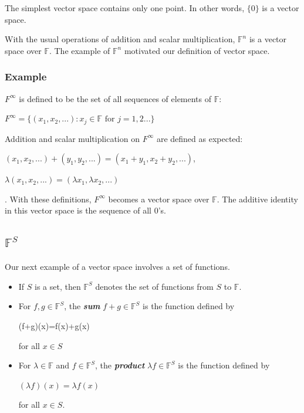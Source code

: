 \documentclass{report}
\begin{document}
The simplest vector space contains only one point. In other words, $\{0\}$ is a vector space.\newline

With the usual operations of addition and scalar multiplication, $\mathbb{F}^n$ is a vector space over $\mathbb{F}$. The example of $\mathbb{F}^n$ motivated our definition of vector space.

\subsubsection{Example}
$F^\infty$ is defined to be the set of all sequences of elements of $\mathbb{F}$:\newline
\centerline{$F^\infty = \{(x_1,x_2,...):x_j \in \mathbb{F} \text{ for } j=1,2...\}$}\newline\newline
Addition and scalar multiplication on $F^\infty$ are defined as expected:\newline
	\centerline{$(x_1,x_2,...)+(y_1,y_2,...)=(x_1+y_1,x_2+y_2,...)$,}\newline
    \centerline{$\lambda(x_1,x_2,...)=(\lambda x_1, \lambda x_2, ...)$}.\newline
With these definitions, $F^\infty$ becomes a vector space over $\mathbb{F}$. The additive identity in this vector space is the sequence of all 0's. 

\subsection{$\mathbb{F}^S$}
Our next example of a vector space involves a set of functions.
\begin{itemize}
	\item If $S$ is a set, then $\mathbb{F}^S$ denotes the set of functions from $S$ to $\mathbb{F}$.
    \item For $f,g \in \mathbb{F}^S$, the \textbf{\textit{sum}} $f+g \in \mathbb{F}^S$ is the function defined by\newline
    	\centerline{(f+g)(x)=f(x)+g(x)}\newline
       	for all $x \in S$
    \item For $\lambda \in \mathbb{F}$ and $f \in \mathbb{F}^S$, the \textbf{\textit{product}} $\lambda f \in \mathbb{F}^S$ is the function defined by\newline
    	\centerline{$(\lambda f)(x)=\lambda f(x)$}\newline
    for all $x \in S$.
\end{itemize}
\end{document}
